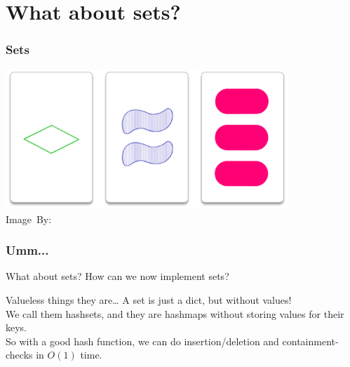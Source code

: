 \section{What about sets?}%
\label{sec:what_about_sets_}

\begin{frame}
	\frametitle{Sets}
	
	\begin{center}
		\includegraphics[width=0.8\textwidth]{figures/set.png}\\
		\hspace*{15pt}\hbox{\scriptsize Image By:}
	\end{center}
\end{frame}

\begin{frame}
	\frametitle{Umm...}

	\begin{questionblock}{What about sets?}
		How can we now implement sets?
	\end{questionblock}
	\pause
	\begin{answerblock}{Valueless things they are\dots}
		A set is just a dict, but without values!	\\
		We call them hashsets, and they are hashmaps without storing values for their keys.\\
		\pause
		So with a good hash function, we can do insertion/deletion and containment-checks in $O(1)$ time.
	\end{answerblock}
\end{frame}
